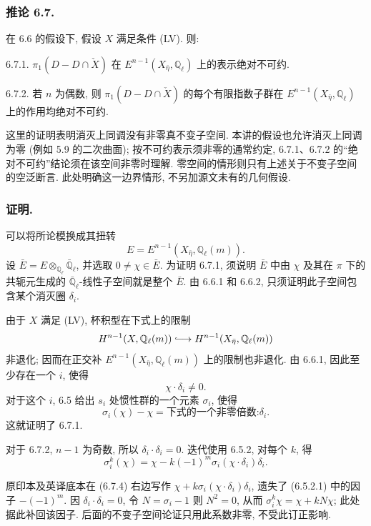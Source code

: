 \subsubsection*{推论 6.7.}
在 6.6 的假设下, 假设 $X$ 满足条件 (LV). 则:

\medskip
\noindent
\textup{6.7.1.} $\pi_1(D-D\cap\check X)$ 在 $E^{n-1}(X_{\bar\eta},\mathbb Q_\ell)$ 上的表示绝对不可约.

\medskip
\noindent
\textup{6.7.2.} 若 $n$ 为偶数, 则 $\pi_1(D-D\cap\check X)$ 的每个有限指数子群在 $E^{n-1}(X_{\bar\eta},\mathbb Q_\ell)$ 上的作用均绝对不可约.

\begin{editorialnote}
这里的证明表明消灭上同调没有非零真不变子空间. 本讲的假设也允许消灭上同调为零 (例如 5.9 的二次曲面); 按不可约表示须非零的通常约定, 6.7.1、6.7.2 的“绝对不可约”结论须在该空间非零时理解. 零空间的情形则只有上述关于不变子空间的空泛断言. 此处明确这一边界情形, 不另加源文未有的几何假设.
\end{editorialnote}

\subsubsection*{证明.}
可以将所论模换成其扭转
\[
E=E^{n-1}(X_{\bar\eta},\mathbb Q_\ell(m)).
\]
设 $\bar E=E\otimes_{\mathbb Q_\ell}\bar{\mathbb Q}_\ell$, 并选取 $0\ne\chi\in\bar E$. 为证明 6.7.1, 须说明 $\bar E$ 中由 $\chi$ 及其在 $\pi$ 下的共轭元生成的 $\bar{\mathbb Q}_\ell$-线性子空间就是整个 $\bar E$. 由 6.6.1 和 6.6.2, 只须证明此子空间包含某个消灭圈 $\delta_i$.

由于 $X$ 满足 (LV), 杯积型在下式上的限制
\[
H^{n-1}(X,\mathbb Q_\ell(m))
\lhook\joinrel\longrightarrow
H^{n-1}(X_{\bar\eta},\mathbb Q_\ell(m))
\]
非退化; 因而在正交补 $E^{n-1}(X_{\bar\eta},\mathbb Q_\ell(m))$ 上的限制也非退化. 由 6.6.1, 因此至少存在一个 $i$, 使得
\[
\chi\cdot\delta_i\ne0.
\]
对于这个 $i$, 6.5 给出 $s_i$ 处惯性群的一个元素 $\sigma_i$, 使得
\begin{equation}\tag{6.7.3}
\sigma_i(\chi)-\chi
=\text{下式的一个非零倍数:}\delta_i.
\end{equation}
这就证明了 6.7.1.

对于 6.7.2, $n-1$ 为奇数, 所以 $\delta_i\cdot\delta_i=0$. 迭代使用 6.5.2, 对每个 $k$, 得
\begin{equation}\tag{6.7.4}
\sigma_i^k(\chi)
=\chi-k(-1)^m\sigma_i(\chi\cdot\delta_i)\delta_i.
\end{equation}
\begin{editorialnote}
原印本及英译底本在 (6.7.4) 右边写作 $\chi+k\sigma_i(\chi\cdot\delta_i)\delta_i$, 遗失了 (6.5.2.1) 中的因子 $-(-1)^m$. 因 $\delta_i\cdot\delta_i=0$, 令 $N=\sigma_i-1$ 则 $N^2=0$, 从而 $\sigma_i^k\chi=\chi+kN\chi$; 此处据此补回该因子. 后面的不变子空间论证只用此系数非零, 不受此订正影响.
\end{editorialnote}

